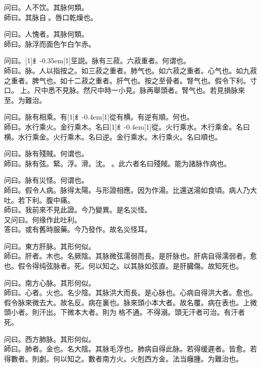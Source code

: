 \documentclass[oneside,b4paper]{ctexbook}
\begin{document}
\begin{flushleft}
问曰。人不饮。其脉何類。\\
師曰。其脉自{𬈧}。唇口乾燥也。

问曰。人愧者。其脉何類。\\
師曰。脉浮而面色乍白乍赤。

问曰。{\hbox{\scalebox{0.68}[1]{纟}\kern-0.35em\scalebox{0.64}[1]{巠}}}説。脉有三菽。六菽重者。何谓也。\\
師曰。脉。人以指按之。如三菽之重者。肺气也。如六菽之重者。心气也。如九菽之重者。脾气也。如十二菽之重者。肝气也。按之至骨者。腎气也。假令下利。寸口。{𬮦}上。尺中悉不見脉。然尺中時一小見。脉再舉頭者。腎气也。若見損脉來至。为難治。

问曰。脉有相乘。有{\hbox{\scalebox{0.6}[1]{纟}\kern-0.4em\scalebox{0.7}[1]{從}}}有横。有逆有順。何也。\\
師曰。水行乘火。金行乘木。名曰{\hbox{\scalebox{0.6}[1]{纟}\kern-0.4em\scalebox{0.7}[1]{從}}}。火行乘水。木行乘金。名曰横。水行乘金。火行乘木。名曰逆。金行乘水。木行乘火。名曰順也。

问曰。脉有殘賊。何谓也。\\
師曰。脉有弦。緊。浮。滑。沈。{𬈧}。此六者名曰殘賊。能为諸脉作病也。

问曰。脉有災怪。何谓也。\\
師曰。假令人病。脉得太陽。与形證相應。因为作湯。比還送湯如食頃。病人乃大吐。若下利。腹中痛。\\
師曰。我前來不見此證。今乃變異。是名災怪。\\
又问曰。何缘作此吐利。\\
答曰。或有舊時服藥。今乃發作。故名災怪耳。

问曰。東方肝脉。其形何似。\\
師曰。肝者。木也。名厥陰。其脉微弦濡弱而長。是肝脉也。肝病自得濡弱者。愈也。假令得纯弦脉者。死。何以知之。以其脉如弦直。是肝臓傷。故知死也。

问曰。南方心脉。其形何似。\\
師曰。心者。火也。名少陰。其脉洪大而長。是心脉也。心病自得洪大者。愈也。假令脉來微去大。故名反。病在裏也。脉來頭小本大者。故名覆。病在表也。上微頭小者。則汗出。下微本大者。則为{𬮦}格不通。不得溺。頭无汗者可治。有汗者死。

问曰。西方肺脉。其形何似。\\
師曰。肺者。金也。名大陰。其脉毛浮也。肺病自得此脉。若得缓遲者。皆愈。若得數者。則劇。何以知之。數者南方火。火剋西方金。法当癰腫。为難治也。


\end{flushleft}
\end{document}
